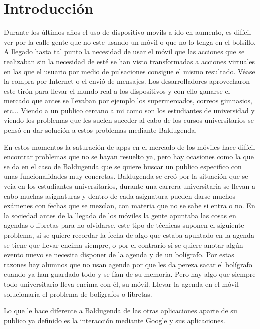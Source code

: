 \chapter{Introducción}

Durante los últimos años el uso de \glspl{dispositivo movil} a ido en aumento, es difícil ver por la calle gente que no este usando un móvil o que no lo tenga en el bolsillo. A llegado hasta tal punto la necesidad de usar el móvil que las acciones que se realizaban sin la necesidad de esté se han visto transformadas a acciones virtuales en las que el usuario por medio de pulsaciones consigue el mismo resultado. Véase la compra por Internet o el envió de mensajes.
Los desarrolladores aprovecharon este tirón para llevar el mundo real a los dispositivos y con ello ganarse el mercado que antes se llevaban por ejemplo los supermercados, correos gimnasios, etc...
Viendo a un publico cercano a mi como son los estudiantes de universidad y viendo los problemas que les suelen suceder al cabo de los cursos universitarios se pensó en dar solución a estos problemas mediante Baldugenda.

En estos momentos la saturación de apps en el mercado de los móviles hace difícil encontrar problemas que no se hayan resuelto ya, pero hay ocasiones como la que se da en el caso de Baldugenda que se quiere buscar un publico especifico con unas funcionalidades muy concretas. Baldugenda se creó por la situación que se veía en los estudiantes universitarios, durante una carrera universitaria se llevan a cabo muchas asignaturas y dentro de cada asignatura pueden darse muchos exámenes con fechas que se mezclan, con materia que no se sabe si entra o no. En la sociedad antes de la llegada de los móviles la gente apuntaba las cosas en agendas o libretas para no olvidarse, este tipo de técnicas suponen el siguiente problema, si se quiere recordar la fecha de algo que estaba apuntado en la agenda se tiene que llevar encima siempre, o por el contrario si se quiere anotar algún evento nuevo se necesita disponer de la agenda y de un bolígrafo. Por estas razones hay alumnos que no usan agenda por que les da pereza sacar el bolígrafo cuando ya han guardado todo y se fían de su memoria. Pero hay algo que siempre todo universitario lleva encima con él, su móvil. Llevar la agenda en el móvil solucionaría el problema de bolígrafos o libretas. 

Lo que le hace diferente a Baldugenda de las otras aplicaciones aparte de su publico ya definido es la interacción mediante Google y sus aplicaciones.

